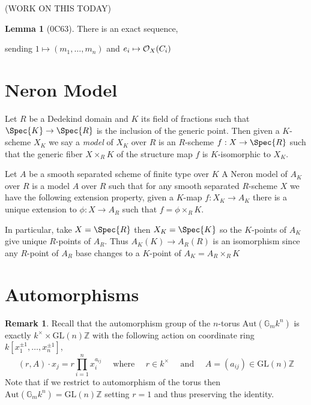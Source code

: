 \documentclass[12pt]{extarticle}
\newcommand{\Z}{\mathbb{Z}}
\theoremstyle{definition}
\newtheorem{lemma}[theorem]{Lemma}
\newtheorem{remark}{Remark}
\newenvironment{definition}[1][Definition:]{\begin{trivlist}
\item[\hskip \labelsep {\bfseries #1}]}{\end{trivlist}}
\newcommand{\GL}[1]{\mathrm{GL}\left(#1\right)}
\newcommand{\Aut}[1]{\mathrm{Aut}\left(#1 \right)}
\newcommand{\Gm}{\mathbb{G}_m}
\begin{document}
(WORK ON THIS TODAY)

\begin{lemma}[0C63]
There is an exact sequence,
\begin{center}
\end{center}
sending $1 \mapsto (m_1, \dots, m_n)$ and $e_i \mapsto \mathcal{O}_{X}(C_i)$ 
\end{lemma}

\section{Neron Model}

\begin{definition}
Let $R$ be a Dedekind domain and $K$ its field of fractions such that $\Spec{K} \to \Spec{R}$ is the inclusion of the generic point. Then given a $K$-scheme $X_K$ we say a \textit{model} of $X_K$ over $R$ is an $R$-scheme $f : X \to \Spec{R}$ such that the generic fiber $X \times_R K$ of the structure map $f$ is $K$-isomorphic to $X_K$. 
\end{definition}

\begin{definition}
Let $A$ be a smooth separated scheme of finite type over $K$
A Neron model of $A_K$ over $R$ is a model $A$ over $R$ such that for any smooth separated $R$-scheme $X$ we have the following extension property, given a $K$-map $f : X_K \to A_K$ there is a unique extension to $\phi : X \to A_R$ such that $f = \phi \times_R K$.  
\begin{center}
\end{center}
In particular, take $X = \Spec{R}$ then $X_K = \Spec{K}$ so the $K$-points of $A_K$ give unique $R$-points of $A_R$. Thus $A_K(K) \to A_R(R)$ is an isomorphism since any $R$-point of $A_R$ base changes to a $K$-point of $A_K = A_R \times_R K$ 
\end{definition}


\section{Automorphisms}

\begin{remark}
Recall that the automorphism group of the $n$-torus $\Aut{\Gm{k}^n}$ is exactly $k^\times \times \GL{n}{\Z}$ with the following action on coordinate ring $k[x_1^{\pm 1}, \dots, x_n^{\pm 1}]$,
\begin{equation}
(r,  A) \cdot x_j = r \prod_{i = 1}^n x_i^{a_{ij}} \quad \text{ where } \quad r \in k^\times \quad \text{ and } \quad A = (a_{ij}) \in \GL{n}{\Z} 
\end{equation}
Note that if we restrict to automorphism of the torus  then $\Aut{\Gm{k}^n} = \GL{n}{\Z}$ setting $r = 1$ and thus preserving the identity. 
\end{remark}
\end{document}

